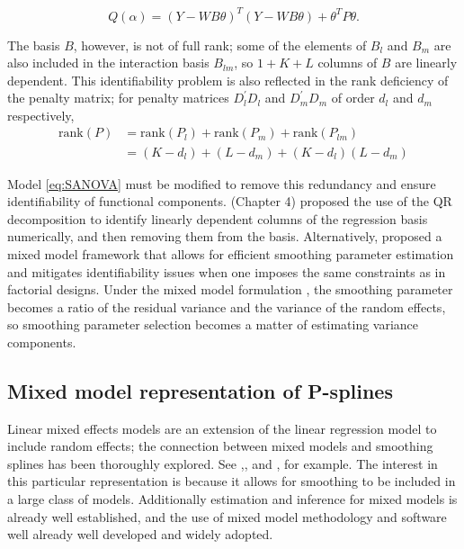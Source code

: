 \documentclass[12pt]{article}
\newcommand{\ms}{\scriptscriptstyle}
\theoremstyle{definition}
\begin{document}
\begin{equation} \label{eq:PSANOVA-objective-function}
Q\left(\alpha\right) = \left( Y - WB\theta \right)^T\left( Y - WB\theta \right) +  \theta^T P \theta.
\end{equation}


The basis $B$, however, is not of full rank; some of the elements of $B_l$ and $B_m$ are also included in the interaction basis $B_{lm}$, so $1 + K+ L$ columns of $B$ are linearly dependent. This identifiability problem is also reflected in the rank deficiency of the penalty matrix; for penalty matrices $D_l^\prime D_l$ and $D_m^\prime D_m$ of order $d_{\ms l}$ and $d_{\ms m}$ respectively, 
\begin{align*}
\mbox{rank}\left(P\right) &=  \mbox{rank}\left(P_l\right) + \mbox{rank}\left(P_m\right) + \mbox{rank}\left(P_{lm}\right) \\
&= \left(K - d_{\ms l}\right) + \left( L - d_{\ms m}\right) +  \left(K - d_{\ms l}\right)\left( L - d_{\ms m}\right)
\end{align*}

Model \ref{eq:SANOVA} must be modified to remove this redundancy and ensure identifiability of functional components. \citet{wood2017generalized} (Chapter 4) proposed the use of the QR decomposition to identify linearly dependent columns of the regression basis numerically, and then removing them from the basis. Alternatively, \citet{lee2011p} proposed a mixed model framework that allows for efficient smoothing parameter estimation and mitigates identifiability issues when one imposes the same constraints as in factorial designs. Under the mixed model formulation , the smoothing parameter becomes a ratio of the residual variance and the variance of the random effects, so smoothing parameter selection becomes a matter of estimating  variance components. 

\subsection{Mixed model representation of  P-splines}


Linear mixed effects models are an extension of the linear regression model to include random effects; the connection between mixed models and smoothing splines has been thoroughly explored. See \citet{},\citet{}, and \citet{}, for example. The interest in this particular representation is because it allows for smoothing to be included in a large class of models. Additionally estimation and inference for mixed models is already well established, and the use of mixed model methodology and software well already well developed and widely adopted.
\end{document}
